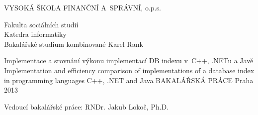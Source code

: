 \begin{titlepage}
\begin{center}
{\Large VYSOKÁ ŠKOLA FINANČNÍ A~SPRÁVNÍ, o.p.s.}

{\large Fakulta sociálních studií\\
Katedra informatiky\\
Bakalářské studium kombinované}
\vfill
{\Large Karel Rank\\[1in]}

{\large Implementace a srovnání výkonu implementací DB indexu v~C++, .NETu a Javě\\
Implementation and efficiency comparison of implementations of a database index in programming languages C++, .NET and Java}
\vfill
{\Large BAKALÁŘSKÁ PRÁCE}
\vfill
{\large Praha 2013}

\end{center}
{\large Vedoucí bakalářské práce: RNDr. Jakub Lokoč, Ph.D.}
\end{titlepage}